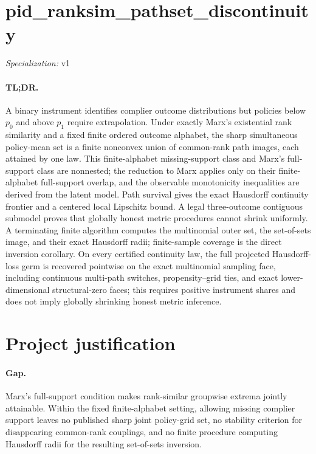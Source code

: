 \documentclass{article}
\begin{document}
\sloppy

\section*{pid\_\allowbreak{}ranksim\_\allowbreak{}pathset\_\allowbreak{}discontinuity}

\noindent\textit{Specialization:} v1\par

\paragraph{TL;DR.} A binary instrument identifies complier outcome distributions but policies below \(p_0\) and above \(p_1\) require extrapolation. Under exactly Marx's existential rank similarity and a fixed finite ordered outcome alphabet, the sharp simultaneous policy-mean set is a finite nonconvex union of common-rank path images, each attained by one law. This finite-alphabet missing-support class and Marx's full-support class are nonnested; the reduction to Marx applies only on their finite-alphabet full-support overlap, and the observable monotonicity inequalities are derived from the latent model. Path survival gives the exact Hausdorff continuity frontier and a centered local Lipschitz bound. A legal three-outcome contiguous submodel proves that globally honest metric procedures cannot shrink uniformly. A terminating finite algorithm computes the multinomial outer set, the set-of-sets image, and their exact Hausdorff radii; finite-sample coverage is the direct inversion corollary. On every certified continuity law, the full projected Hausdorff-loss germ is recovered pointwise on the exact multinomial sampling face, including continuous multi-path switches, propensity--grid ties, and exact lower-dimensional structural-zero faces; this requires positive instrument shares and does not imply globally shrinking honest metric inference.

\section{Project justification}

\paragraph{Gap.} Marx's full-support condition makes rank-similar groupwise extrema jointly attainable. Within the fixed finite-alphabet setting, allowing missing complier support leaves no published sharp joint policy-grid set, no stability criterion for disappearing common-rank couplings, and no finite procedure computing Hausdorff radii for the resulting set-of-sets inversion.
\end{document}
